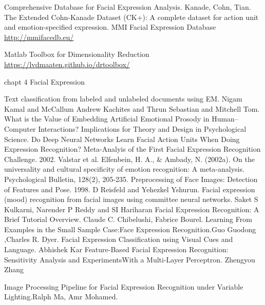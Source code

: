 \documentclass[10pt,twocolumn,letterpaper]{article}
\begin{document}
\begin{thebibliography}{1}
 Comprehensive Database for Facial Expression Analysis. Kanade, Cohn, Tian.
 The Extended Cohn-Kanade Dataset (CK+): A complete dataset for action unit and emotion-specified expression.
 MMI Facial Expression Database \url{http://mmifacedb.eu/}

 Matlab Toolbox for Dimensionality Reduction \url{https://lvdmaaten.github.io/drtoolbox/}

 chapt 4 Facial Expression

Text classification from labeled and unlabeled documents using EM. Nigam Kamal and McCallum  Andrew Kachites and Thrun Sebastian and Mitchell Tom.
 What is the Value of Embedding Artificial Emotional Prosody in Human–Computer Interactions? Implications for Theory and Design in Psychological Science. 
 Do Deep Neural Networks Learn Facial Action Units When Doing Expression Recognition?
 Meta-Analyis of the First Facial Expression Recognition Challenge. 2002. Valstar et al.
 Elfenbein, H. A., \& Ambady, N. (2002a). On the universality and cultural specificity of emotion recognition: A meta-analysis. Psychological Bulletin, 128(2), 205-235. 
 Preprocessing of Face Images: Detection of Features and Pose. 1998. D Reisfeld and Yehezkel Yshurun.
 Facial expression (mood) recognition from facial images using committee neural networks. Saket S Kulkarni, Narender P Reddy and SI Hariharan
 Facial Expression Recognition: A Brief Tutorial Overview. Claude C. Chibelushi, Fabrice Bourel.
Learning From Examples in the Small Sample Case:Face Expression Recognition.Guo Guodong ,Charles R. Dyer.
Facial Expression Classification using Visual Cues and Language. Abhishek Kar
Feature-Based Facial Expression Recognition: Sensitivity Analysis and ExperimentsWith a Multi-Layer Perceptron. Zhengyou Zhang

Image Processing Pipeline for Facial Expression Recognition under Variable Lighting.Ralph Ma, Amr Mohamed.

\end{thebibliography}
\end{document}
